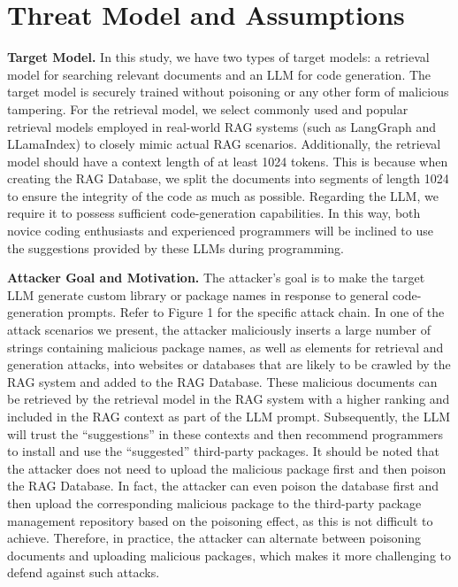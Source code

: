 \section{Threat Model and Assumptions}\label{sec:threat_model}

\textbf{Target Model.} In this study, we have two types of target models: a retrieval model for searching relevant documents and an LLM for code generation. The target model is securely trained without poisoning or any other form of malicious tampering. For the retrieval model, we select commonly used and popular retrieval models employed in real-world RAG systems (such as LangGraph and LLamaIndex) to closely mimic actual RAG scenarios. Additionally, the retrieval model should have a context length of at least 1024 tokens. This is because when creating the RAG Database, we split the documents into segments of length 1024 to ensure the integrity of the code as much as possible. Regarding the LLM, we require it to possess sufficient code-generation capabilities. In this way, both novice coding enthusiasts and experienced programmers will be inclined to use the suggestions provided by these LLMs during programming. 

\textbf{Attacker Goal and Motivation.} The attacker's goal is to make the target LLM generate custom library or package names in response to general code-generation prompts. Refer to Figure 1 for the specific attack chain.
In one of the attack scenarios we present, the attacker maliciously inserts a large number of strings containing malicious package names, as well as elements for retrieval and generation attacks, into websites or databases that are likely to be crawled by the RAG system and added to the RAG Database. These malicious documents can be retrieved by the retrieval model in the RAG system with a higher ranking and included in the RAG context as part of the LLM prompt. Subsequently, the LLM will trust the “suggestions” in these contexts and then recommend programmers to install and use the “suggested” third-party packages.
It should be noted that the attacker does not need to upload the malicious package first and then poison the RAG Database. In fact, the attacker can even poison the database first and then upload the corresponding malicious package to the third-party package management repository based on the poisoning effect, as this is not difficult to achieve. Therefore, in practice, the attacker can alternate between poisoning documents and uploading malicious packages, which makes it more challenging to defend against such attacks. 


